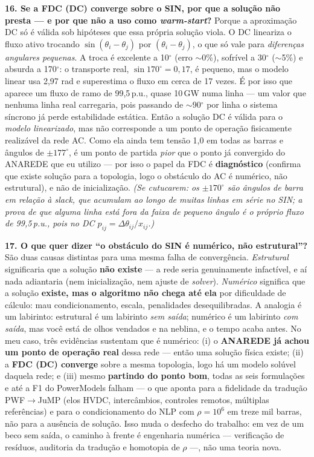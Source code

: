 \documentclass[11pt,a4paper]{article}
\begin{document}
\textbf{16. Se a FDC (DC) converge sobre o SIN, por que a solução não presta --- e por que não a uso como \textit{warm-start}?} Porque a aproximação DC só é válida sob hipóteses que essa própria solução viola. O DC lineariza o fluxo ativo trocando $\sin(\theta_i-\theta_j)$ por $(\theta_i-\theta_j)$, o que só vale para \emph{diferenças angulares pequenas}. A troca é excelente a 10$^\circ$ (erro $\sim$0\%), sofrível a 30$^\circ$ ($\sim$5\%) e absurda a 170$^\circ$: o transporte real, $\sin 170^\circ = 0{,}17$, é pequeno, mas o modelo linear usa 2{,}97 rad e superestima o fluxo em cerca de 17 vezes. É por isso que aparece um fluxo de ramo de 99{,}5\,p.u., quase 10\,GW numa linha --- um valor que nenhuma linha real carregaria, pois passando de $\sim$90$^\circ$ por linha o sistema síncrono já perde estabilidade estática. Então a solução DC é válida para o \emph{modelo linearizado}, mas não corresponde a um ponto de operação fisicamente realizável da rede AC. Como ela ainda tem tensão 1{,}0 em todas as barras e ângulos de $\pm 177^\circ$, é um ponto de partida \emph{pior} que o ponto já convergido do ANAREDE que eu utilizo --- por isso o papel da FDC é \textbf{diagnóstico} (confirma que existe solução para a topologia, logo o obstáculo do AC é numérico, não estrutural), e não de inicialização. \textit{\textcolor{cue}{(Se cutucarem: os $\pm 170^\circ$ são ângulos de barra em relação à \textit{slack}, que acumulam ao longo de muitas linhas em série no SIN; a prova de que \emph{alguma} linha está fora da faixa de pequeno ângulo é o próprio fluxo de 99{,}5\,p.u., pois no DC $p_{ij}=\Delta\theta_{ij}/x_{ij}$.)}}

\textbf{17. O que quer dizer ``o obstáculo do SIN é numérico, não estrutural''?} São duas causas distintas para uma mesma falha de convergência. \emph{Estrutural} significaria que a solução \textbf{não existe} --- a rede seria genuinamente infactível, e aí nada adiantaria (nem inicialização, nem ajuste de \textit{solver}). \emph{Numérico} significa que a solução \textbf{existe, mas o algoritmo não chega até ela} por dificuldade de cálculo: mau condicionamento, escala, penalidades desequilibradas. A analogia é um labirinto: estrutural é um labirinto \emph{sem saída}; numérico é um labirinto \emph{com saída}, mas você está de olhos vendados e na neblina, e o tempo acaba antes. No meu caso, três evidências sustentam que é numérico: (i) o \textbf{ANAREDE já achou um ponto de operação real} dessa rede --- então uma solução física existe; (ii) a \textbf{FDC (DC) converge} sobre a mesma topologia, logo há um modelo solúvel daquela rede; e (iii) mesmo \textbf{partindo do ponto bom}, todas as seis formulações e até a F1 do PowerModels falham --- o que aponta para a fidelidade da tradução PWF$\to$JuMP (elos HVDC, intercâmbios, controles remotos, múltiplas referências) e para o condicionamento do NLP com $\rho = 10^6$ em treze mil barras, não para a ausência de solução. Isso muda o desfecho do trabalho: em vez de um beco sem saída, o caminho à frente é engenharia numérica --- verificação de resíduos, auditoria da tradução e homotopia de $\rho$ ---, não uma teoria nova.
\end{document}
